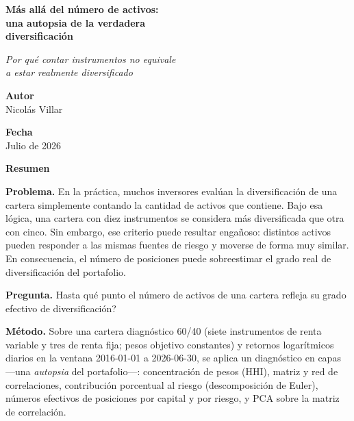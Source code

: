 \documentclass[12pt,letterpaper]{article}
\begin{document}
\begin{titlepage}
\centering
\vspace*{3.2cm}

{\LARGE\bfseries Más allá del número de activos:\\[0.35em]
una autopsia de la verdadera\\[0.15em]
diversificación\par}

\vspace{1.1em}

{\Large\itshape Por qué contar instrumentos no equivale\\
a estar realmente diversificado\par}

\vspace{2.6em}

{\bfseries Autor}\\[0.35em]
Nicolás Villar

\vspace{1.6em}

{\bfseries Fecha}\\[0.35em]
Julio de 2026

\vfill
\end{titlepage}

\begin{center}
{\LARGE\bfseries Resumen}
\end{center}
\vspace{0.8em}

\noindent\textbf{Problema.}
En la práctica, muchos inversores evalúan la diversificación de una cartera simplemente contando la cantidad de activos que contiene. Bajo esa lógica, una cartera con diez instrumentos se considera más diversificada que otra con cinco. Sin embargo, ese criterio puede resultar engañoso: distintos activos pueden responder a las mismas fuentes de riesgo y moverse de forma muy similar. En consecuencia, el número de posiciones puede sobreestimar el grado real de diversificación del portafolio.

\noindent\textbf{Pregunta.}
\textquestiondown{}Hasta qué punto el número de activos de una cartera refleja su grado efectivo de diversificación?

\noindent\textbf{Método.}
Sobre una cartera diagnóstico 60/40 (siete instrumentos de renta variable y tres de renta fija; pesos objetivo constantes) y retornos logarítmicos diarios en la ventana 2016-01-01 a 2026-06-30, se aplica un diagnóstico en capas ---una \emph{autopsia} del portafolio---: concentración de pesos (HHI), matriz y red de correlaciones, contribución porcentual al riesgo (descomposición de Euler), números efectivos de posiciones por capital y por riesgo, y PCA sobre la matriz de correlación.
\end{document}
